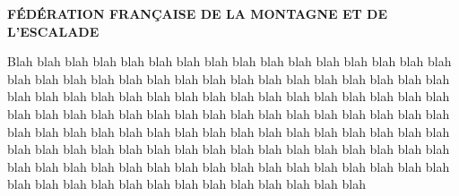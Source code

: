 ﻿\documentclass{report}
\begin{document}
\begin{center}
\sf\bfseries
F\'ED\'ERATION FRAN\c{C}AISE DE LA MONTAGNE ET DE L'ESCALADE
\end{center}

Blah blah blah blah blah blah blah blah blah blah blah blah blah blah blah blah blah
blah blah blah blah blah blah blah blah blah blah blah blah blah blah blah blah blah blah
blah blah blah blah blah blah blah blah blah blah blah blah blah blah blah blah blah blah
blah blah blah blah blah blah blah blah blah blah blah blah blah blah blah blah blah blah
blah blah blah blah blah blah blah blah blah blah blah blah blah blah blah blah blah blah
blah blah blah blah blah blah blah blah blah blah blah blah blah blah blah blah blah blah
blah blah blah blah blah blah blah blah blah blah blah blah blah blah blah blah blah blah
\end{document}
